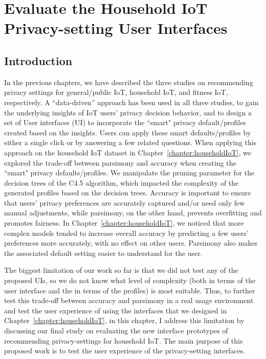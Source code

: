 \chapter{Evaluate the Household IoT Privacy-setting User Interfaces}\label{chapter:evaluation}

\section{Introduction}

In the previous chapters, we have described the three studies on recommending privacy settings for general/public IoT, household IoT, and fitness IoT, respectively. A ``data-driven” approach has been used in all three studies, to gain the underlying insights of IoT users' privacy decision behavior, and to design a set of User interfaces (UI) to incorporate the ``smart" privacy default/profiles created based on the insights. Users can apply these smart defaults/profiles by either a single click or by answering a few related questions. When applying this approach on the household IoT dataset in Chapter~\ref{chapter:householdIoT}, we explored the trade-off between parsimony and accuracy when creating the ``smart" privacy defaults/profiles. We manipulate the pruning parameter for the decision trees of the C4.5 algorithm, which impacted the complexity of the generated profiles based on the decision trees. Accuracy is important to ensure that users' privacy preferences are accurately captured and/or need only few manual adjustments, while parsimony, on the other hand, prevents overfitting and promotes fairness. In Chapter~\ref{chapter:householdIoT}, we noticed that more complex models tended to increase overall accuracy by predicting a few users' preferences more accurately, with no effect on other users. Parsimony also makes the associated default setting easier to understand for the user. 

The biggest limitation of our work so far is that we did not test any of the proposed UIs, so we do not know what level of complexity (both in terms of the user interface and the in terms of the profiles) is most suitable. Thus, to further test this trade-off between accuracy and parsimony in a real usage environment and test the user experience of using the interfaces that we designed in Chapter~\ref{chapter:householdIoT}, in this chapter, I address this limitation by discussing our final study on evaluating the new interface prototypes of recommending privacy-settings for household IoT. The main purpose of this proposed work is to test the user experience of the privacy-setting interfaces.

